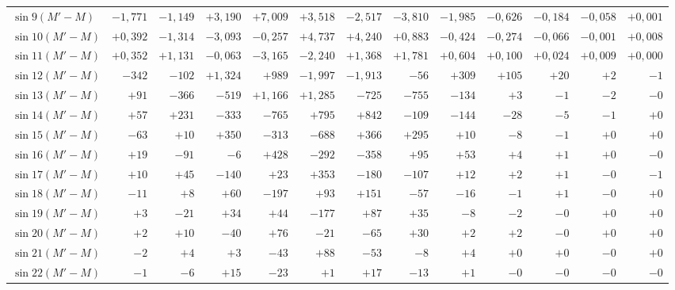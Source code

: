 \begin{landscape}
\begin{longtable}{@{}l|r|r|r|r|r|r|r|r|r|r|r|r@{}}
\(\sin 9(M'-M)\) & \(-1{,}771\) & \(-1{,}149\) & \(+3{,}190\) & \(+7{,}009\) & \(+3{,}518\) & \(-2{,}517\) & \(-3{,}810\) & \(-1{,}985\) & \(-0{,}626\) & \(-0{,}184\) & \(-0{,}058\) & \(+0{,}001\)\\
\(\sin 10(M'-M)\) & \(+0{,}392\) & \(-1{,}314\) & \(-3{,}093\) & \(-0{,}257\) & \(+4{,}737\) & \(+4{,}240\) & \(+0{,}883\) & \(-0{,}424\) & \(-0{,}274\) & \(-0{,}066\) & \(-0{,}001\) & \(+0{,}008\)\\
\(\sin 11(M'-M)\) & \(+0{,}352\) & \(+1{,}131\) & \(-0{,}063\) & \(-3{,}165\) & \(-2{,}240\) & \(+1{,}368\) & \(+1{,}781\) & \(+0{,}604\) & \(+0{,}100\) & \(+0{,}024\) & \(+0{,}009\) & \(+0{,}000\)\\
\(\sin 12(M'-M)\) & \(-342\) & \(-102\) & \(+1{,}324\) & \(+989\) & \(-1{,}997\) & \(-1{,}913\) & \(-56\) & \(+309\) & \(+105\) & \(+20\) & \(+2\) & \(-1\)\\
\(\sin 13(M'-M)\) & \(+91\) & \(-366\) & \(-519\) & \(+1{,}166\) & \(+1{,}285\) & \(-725\) & \(-755\) & \(-134\) & \(+3\) & \(-1\) & \(-2\) & \(-0\)\\
\(\sin 14(M'-M)\) & \(+57\) & \(+231\) & \(-333\) & \(-765\) & \(+795\) & \(+842\) & \(-109\) & \(-144\) & \(-28\) & \(-5\) & \(-1\) & \(+0\)\\
\(\sin 15(M'-M)\) & \(-63\) & \(+10\) & \(+350\) & \(-313\) & \(-688\) & \(+366\) & \(+295\) & \(+10\) & \(-8\) & \(-1\) & \(+0\) & \(+0\)\\
\(\sin 16(M'-M)\) & \(+19\) & \(-91\) & \(-6\) & \(+428\) & \(-292\) & \(-358\) & \(+95\) & \(+53\) & \(+4\) & \(+1\) & \(+0\) & \(-0\)\\
\(\sin 17(M'-M)\) & \(+10\) & \(+45\) & \(-140\) & \(+23\) & \(+353\) & \(-180\) & \(-107\) & \(+12\) & \(+2\) & \(+1\) & \(-0\) & \(-1\)\\
\(\sin 18(M'-M)\) & \(-11\) & \(+8\) & \(+60\) & \(-197\) & \(+93\) & \(+151\) & \(-57\) & \(-16\) & \(-1\) & \(+1\) & \(-0\) & \(+0\)\\
\(\sin 19(M'-M)\) & \(+3\) & \(-21\) & \(+34\) & \(+44\) & \(-177\) & \(+87\) & \(+35\) & \(-8\) & \(-2\) & \(-0\) & \(+0\) & \(+0\)\\
\(\sin 20(M'-M)\) & \(+2\) & \(+10\) & \(-40\) & \(+76\) & \(-21\) & \(-65\) & \(+30\) & \(+2\) & \(+2\) & \(-0\) & \(+0\) & \(+0\)\\
\(\sin 21(M'-M)\) & \(-2\) & \(+4\) & \(+3\) & \(-43\) & \(+88\) & \(-53\) & \(-8\) & \(+4\) & \(+0\) & \(+0\) & \(-0\) & \(+0\)\\
\(\sin 22(M'-M)\) & \(-1\) & \(-6\) & \(+15\) & \(-23\) & \(+1\) & \(+17\) & \(-13\) & \(+1\) & \(-0\) & \(-0\) & \(-0\) & \(-0\)\\

\end{longtable}
\end{landscape}

